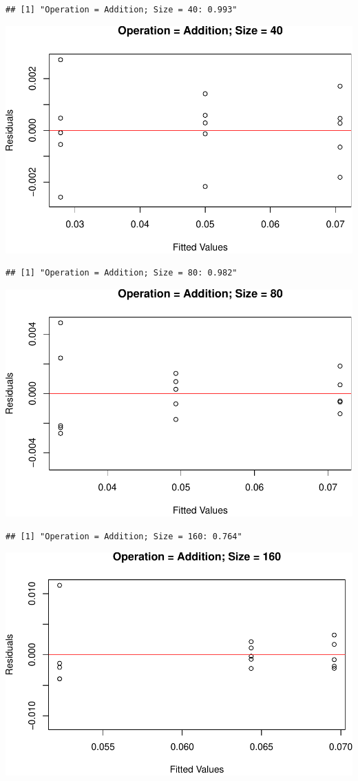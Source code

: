 \documentclass[
]{article}
\begin{document}
\begin{verbatim}
## [1] "Operation = Addition; Size = 40: 0.993"
\end{verbatim}

\includegraphics{main_files/figure-latex/unnamed-chunk-20-3.pdf}

\begin{verbatim}
## [1] "Operation = Addition; Size = 80: 0.982"
\end{verbatim}

\includegraphics{main_files/figure-latex/unnamed-chunk-20-4.pdf}

\begin{verbatim}
## [1] "Operation = Addition; Size = 160: 0.764"
\end{verbatim}

\includegraphics{main_files/figure-latex/unnamed-chunk-20-5.pdf}
\end{document}
